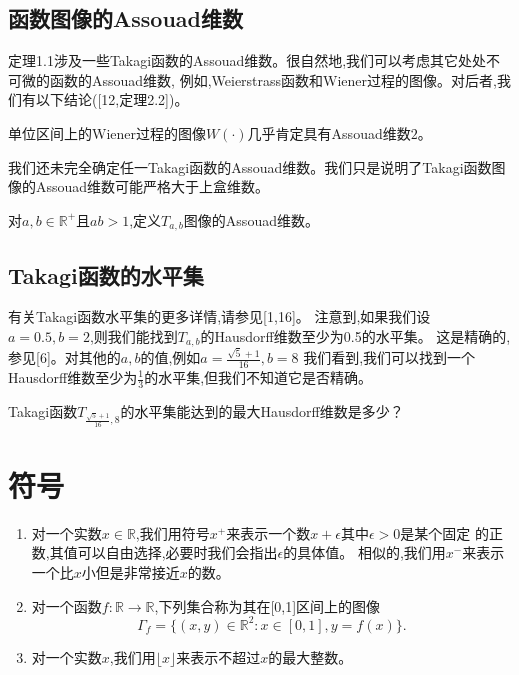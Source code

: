 \subsection{函数图像的Assouad维数}
定理1.1涉及一些Takagi函数的Assouad维数。很自然地,我们可以考虑其它处处不可微的函数的Assouad维数,
例如,Weierstrass函数和Wiener过程的图像。对后者,我们有以下结论([12,定理2.2])。

\begin{theorem}[HY17]
      单位区间上的Wiener过程的图像$W(\cdot)$几乎肯定具有Assouad维数$2$。
\end{theorem}

我们还未完全确定任一Takagi函数的Assouad维数。我们只是说明了Takagi函数图像的Assouad维数可能严格大于上盒维数。

\begin{question}
      对$a,b\in\mathbb{R}^+$且$ab>1$,定义$T_{a,b}$图像的Assouad维数。
\end{question}

\subsection{Takagi函数的水平集}
有关Takagi函数水平集的更多详情,请参见[1,16]。
注意到,如果我们设$a=0.5,b=2$,则我们能找到$T_{a,b}$的Hausdorff维数至少为0.5的水平集。
这是精确的,参见[6]。对其他的$a,b$的值,例如$a=\frac{\sqrt{5}+1}{16},b=8$
我们看到,我们可以找到一个Hausdorff维数至少为$\frac{1}{3}$的水平集,但我们不知道它是否精确。

\begin{question}
      Takagi函数$T_{\frac{\sqrt{5}+1}{16},8}$的水平集能达到的最大Hausdorff维数是多少？
\end{question}

\section{符号}
\begin{enumerate}
      \item 对一个实数$x\in\mathbb{R}$,我们用符号$x^+$来表示一个数$x+\epsilon$其中$\epsilon>0$是某个固定
      的正数,其值可以自由选择,必要时我们会指出$\epsilon$的具体值。
      相似的,我们用$x^-$来表示一个比$x$小但是非常接近$x$的数。
      \item 对一个函数$f:\mathbb{R}\rightarrow\mathbb{R}$,下列集合称为其在[0,1]区间上的图像
      $$
      \Gamma_f=\{(x,y)\in\mathbb{R}^2:x\in[0,1],y=f(x)\}.
      $$
      \item 对一个实数$x$,我们用$\lfloor x\rfloor$来表示不超过$x$的最大整数。
\end{enumerate}

